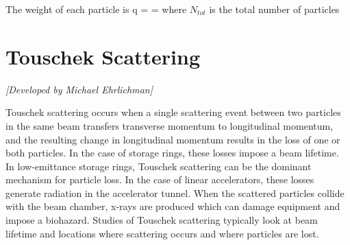 The weight of each particle is
\Begineq
  q =  = 
\Endeq
where $N_{tot}$ is the total number of particles

\section{Touschek Scattering}
\label{s:touschek}

\textit{[Developed by Michael Ehrlichman]}

Touschek scattering occurs when a single
scattering event between two particles in the same beam transfers
transverse momentum to longitudinal momentum, and the resulting change
in longitudinal momentum results in the loss of one or both particles.
In the case of storage rings, these losses impose a beam lifetime.  In
low-emittance storage rings, Touschek scattering can be the dominant
mechanism for particle loss.  In the case of linear accelerators,
these losses generate radiation in the accelerator tunnel.  When the
scattered particles collide with the beam chamber, x-rays are produced
which can damage equipment and impose a biohazard.  Studies of
Touschek scattering typically look at beam lifetime and locations
where scattering occurs and where particles are lost.

